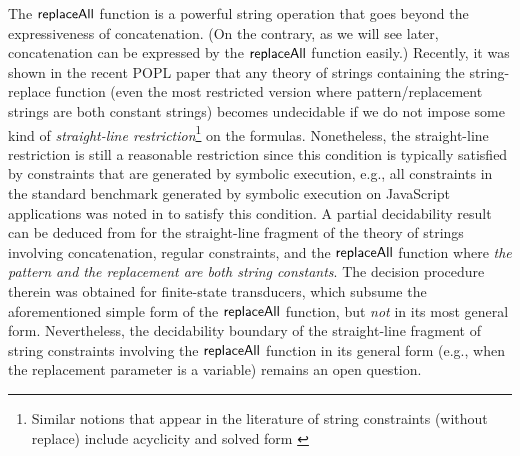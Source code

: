 The $\mathsf{replaceAll}$ function is a powerful string operation that goes beyond the 
expressiveness of concatenation. (On the contrary, as we will see later, concatenation can be expressed by the $\mathsf{replaceAll}$ function easily.) 
Recently, it was shown in the recent POPL paper \cite{LB16} that any theory of strings containing the 
string-replace function (even the most restricted version where 
pattern/replacement strings are both constant strings) becomes undecidable if 
we do not impose some kind of
\emph{straight-line restriction}\footnote{Similar notions that appear in the 
literature of string constraints (without replace) include acyclicity 
\cite{Abdulla14} and solved form \cite{Vijay-length}} on 
the formulas. Nonetheless,
the straight-line restriction is still a reasonable restriction since this
condition is typically satisfied by constraints that are generated by symbolic 
execution,
e.g., all constraints in the standard benchmark \cite{Berkeley-JavaScript}
generated by symbolic execution on JavaScript applications was 
noted in \cite{Vijay-length} to satisfy this condition. 
A partial decidability result 
can be deduced from \cite{LB16}
for the straight-line fragment of the theory of strings involving 
concatenation, regular constraints, and the $\mathsf{replaceAll}$ function where \emph{the 
pattern and the replacement are both string constants}. 
The decision procedure therein was obtained for finite-state transducers, which
subsume the aforementioned simple form of the $\mathsf{replaceAll}$ function, but
\emph{not} in its most general form.
Nevertheless, the decidability boundary of the straight-line fragment of string
constraints involving the $\mathsf{replaceAll}$ function in its general form (e.g., 
when the replacement parameter is a variable) remains an open question.





